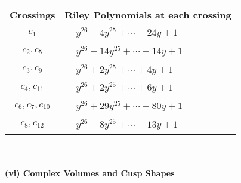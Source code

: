 \documentclass[1p]{elsarticle_modified}
\theoremstyle{definition}
\begin{document}
\begin{tabular}{m{50pt}|m{274pt}}
Crossings & \hspace{64pt}Riley Polynomials at each crossing \\
\hline $$\begin{aligned}c_{1}\end{aligned}$$&$\begin{aligned}
&y^{26}-4 y^{25}+\cdots-24 y+1
\end{aligned}$\\
\hline $$\begin{aligned}c_{2},c_{5}\end{aligned}$$&$\begin{aligned}
&y^{26}-14 y^{25}+\cdots-14 y+1
\end{aligned}$\\
\hline $$\begin{aligned}c_{3},c_{9}\end{aligned}$$&$\begin{aligned}
&y^{26}+2 y^{25}+\cdots+4 y+1
\end{aligned}$\\
\hline $$\begin{aligned}c_{4},c_{11}\end{aligned}$$&$\begin{aligned}
&y^{26}+2 y^{25}+\cdots+6 y+1
\end{aligned}$\\
\hline $$\begin{aligned}c_{6},c_{7},c_{10}\end{aligned}$$&$\begin{aligned}
&y^{26}+29 y^{25}+\cdots-80 y+1
\end{aligned}$\\
\hline $$\begin{aligned}c_{8},c_{12}\end{aligned}$$&$\begin{aligned}
&y^{26}-8 y^{25}+\cdots-13 y+1
\end{aligned}$\\
\hline
\end{tabular}\\~\\
\newpage\flushleft \textbf{(vi) Complex Volumes and Cusp Shapes}
\end{document}
